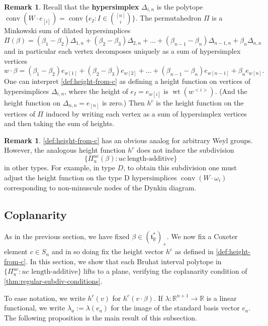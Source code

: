 \documentclass[11pt]{amsart}
\theoremstyle{definition}
\newtheorem{remark}[Thm]{Remark}
\DeclareMathOperator{\wt}{wt}
\newcommand{\RR}{\mathbb{R}}
\newcommand\defn[1]{{\bf #1}}
\def\lin{\lambda}
\def\hgt{h}
\def\pbolic^#1{^{<#1>}}
\def\hc{\hgt^c}
\def\pt{\beta}
\def\BB{{(\lie{t}_\RR^*)_+}}
\newcommand\lie[1]{{\mathfrak #1}}
\DeclareMathOperator{\conv}{conv}
\begin{document}
\begin{remark} 
	Recall that the \defn{hypersimplex} $\Delta_{i,n}$ is the polytope $\conv(W \cdot e_{[i]}) = \conv\{e_I : I \in \binom{[n]}{i}\}$. The permutahedron $\Pi$ is a Minkowski sum of dilated hypersimplices
	\[\Pi(\pt) = (\pt_1 - \pt_2) \Delta_{1,n}+ (\pt_2 - \pt_3) \Delta_{2,n}+ \dots +(\pt_{n-1} - \pt_n) \Delta_{n-1, n} + \pt_n \Delta_{n,n} \]
	and in particular each vertex decomposes uniquely as a sum of hypersimplex vertices
	\[w \cdot \pt =(\pt_1 - \pt_2) e_{w[1]}+ (\pt_2 - \pt_3) e_{w[2]}+ \dots +(\pt_{n-1} - \pt_n) e_{w[n-1]}+ \pt_n e_{w[n]}. \]
One can interpret \cref{def:height-from-c} as defining a height function on vertices of hypersimplices $\Delta_{i,n}$, where the height of $e_I=e_{w[i]}$ is $\wt(w\pbolic^{i})$. (And the height function on $\Delta_{n,n} = e_{[n]}$ is zero.) Then $\hc$ is the height function on the vertices of $\Pi$ induced by writing each vertex as a sum of hypersimplex vertices and then taking the sum of heights.
\end{remark}

\begin{remark}
  \cref{def:height-from-c} has an obvious analog for arbitrary Weyl
  groups. However, the analogous height function $\hc$ does not induce
  the subdivision
  \[ \{\Pi_u^{uc}(\pt): uc~\text{length-additive}\} \]
  in other types. For example, in type $D$, to obtain this subdivision
  one must adjust the height function on the type D hypersimplices
  $\conv(W \cdot \omega_i)$ corresponding to non-minuscule nodes of
  the Dynkin diagram.
\end{remark}

\subsection{Coplanarity}

As in the previous section, we have fixed $\pt \in \BB$. We now fix a Coxeter element $c \in S_n$ and in so doing fix the height vector $\hc$ as defined in \cref{def:height-from-c}. In this section, we show that each Bruhat interval polytope in $\{\Pi_{u}^{uc}: uc \text{ length-additive}\}$ lifts to a plane, verifying the coplanarity condition of \cref{thm:regular-subdiv-conditions}.

To ease notation, we write $\hc(v)$ for $\hc(v \cdot \pt)$.  If $\lin: \RR^{n+1} \to \RR$ is a linear functional, we write $\lin_{a}:=\lin(e_a)$ for the image of the standard basis vector $e_a$. The following proposition is the main result of this subsection.
\end{document}
